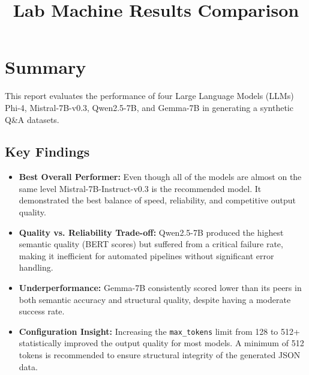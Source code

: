 \documentclass[12pt, a4paper]{article}
\title{\textbf{Lab Machine Results Comparison}}
\begin{document}
\maketitle

\section{Summary}
This report evaluates the performance of four Large Language Models (LLMs) Phi-4, Mistral-7B-v0.3, Qwen2.5-7B, and Gemma-7B in generating a synthetic Q\&A datasets. 

\subsection*{Key Findings}
\begin{itemize}
    \item \textbf{Best Overall Performer:} Even though all of the models are almost on the same level Mistral-7B-Instruct-v0.3 is the recommended model. It demonstrated the best balance of speed, reliability, and competitive output quality.
    \item \textbf{Quality vs. Reliability Trade-off:} Qwen2.5-7B produced the highest semantic quality (BERT scores) but suffered from a critical failure rate, making it inefficient for automated pipelines without significant error handling.
    \item \textbf{Underperformance:} Gemma-7B consistently scored lower than its peers in both semantic accuracy and structural quality, despite having a moderate success rate.
    \item \textbf{Configuration Insight:} Increasing the \texttt{max\_tokens} limit from 128 to 512+ statistically improved the output quality for most models. A minimum of 512 tokens is recommended to ensure structural integrity of the generated JSON data.
\end{itemize}

\end{document}
